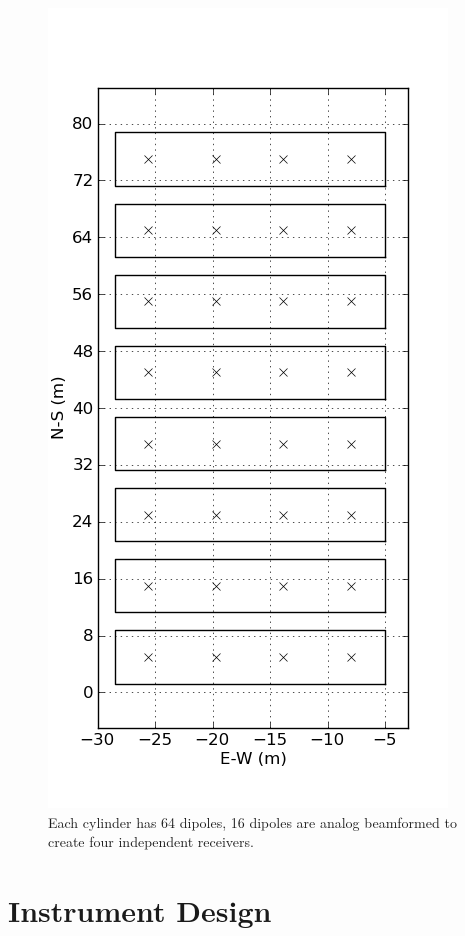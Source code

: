 \documentclass[useAMS,usenatbib,onecolumn]{mn2e}
\begin{document}
\begin{figure}
    \centering
    \includegraphics[scale=0.6]{graphics/layout.png}
    \caption{Each cylinder has 64 dipoles, 16 dipoles are analog beamformed to create four independent receivers.}
    \label{fig:ant_layout}
\end{figure}

\section{Instrument Design}
\end{document}
